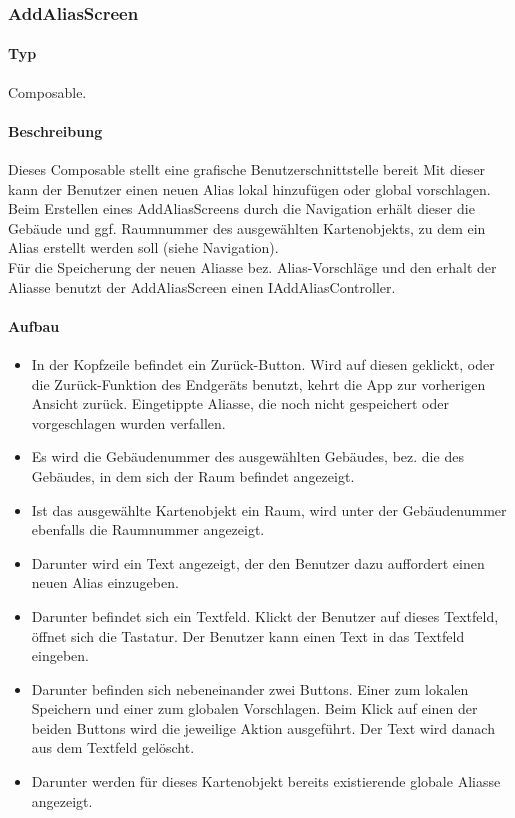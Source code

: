 \subsubsection{AddAliasScreen}
\paragraph*{Typ}
Composable.
\paragraph*{Beschreibung}
Dieses Composable stellt eine grafische Benutzerschnittstelle bereit
Mit dieser kann der Benutzer einen neuen Alias lokal hinzufügen oder global vorschlagen.\\
Beim Erstellen eines AddAliasScreens durch die Navigation erhält dieser die Gebäude und ggf. Raumnummer 
des ausgewählten Kartenobjekts, zu dem ein Alias erstellt werden soll (siehe Navigation).\\
Für die Speicherung der neuen Aliasse bez. Alias-Vorschläge und den erhalt der Aliasse benutzt 
der AddAliasScreen einen IAddAliasController.

\paragraph*{Aufbau}
\begin{itemize}
    \item In der Kopfzeile befindet ein Zurück-Button. Wird auf diesen geklickt, oder die Zurück-Funktion des Endgeräts benutzt, 
    kehrt die App zur vorherigen Ansicht zurück. Eingetippte Aliasse, die noch nicht gespeichert oder vorgeschlagen wurden verfallen.
    \item Es wird die Gebäudenummer des ausgewählten Gebäudes, bez. die des Gebäudes, in dem sich der Raum befindet angezeigt.
    \item Ist das ausgewählte Kartenobjekt ein Raum, wird unter der Gebäudenummer ebenfalls die Raumnummer angezeigt.
    \item Darunter wird ein Text angezeigt, der den Benutzer dazu auffordert einen neuen Alias einzugeben.
    \item Darunter befindet sich ein Textfeld. Klickt der Benutzer auf dieses Textfeld, öffnet sich die Tastatur. 
    Der Benutzer kann einen Text in das Textfeld eingeben.
    \item Darunter befinden sich nebeneinander zwei Buttons. Einer zum lokalen Speichern und einer zum globalen Vorschlagen. 
    Beim Klick auf einen der beiden Buttons wird die jeweilige Aktion ausgeführt. Der Text wird danach aus dem Textfeld gelöscht.
    \item Darunter werden für dieses Kartenobjekt bereits existierende globale Aliasse angezeigt.
\end{itemize}
